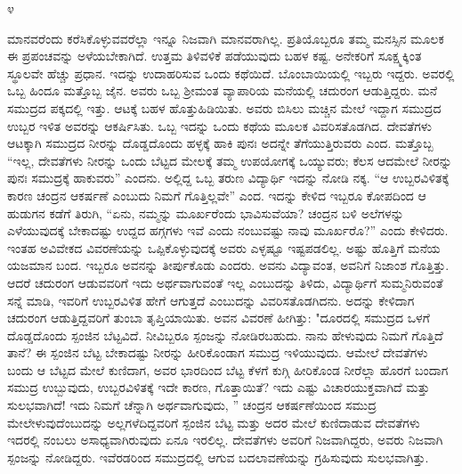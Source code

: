 \begin{center}
೪
\end{center}

ಮಾನವರೆಂದು ಕರೆಸಿಕೊಳ್ಳುವವರೆಲ್ಲಾ ಇನ್ನೂ ನಿಜವಾಗಿ ಮಾನವರಾಗಿಲ್ಲ. ಪ್ರತಿಯೊಬ್ಬರೂ ತಮ್ಮ ಮನಸ್ಸಿನ ಮೂಲಕ ಈ ಪ್ರಪಂಚವನ್ನು ಅಳೆಯಬೇಕಾಗಿದೆ. ಉತ್ತಮ ತಿಳಿವಳಿಕೆ ಪಡೆಯುವುದು ಬಹಳ ಕಷ್ಟ. ಅನೇಕರಿಗೆ ಸೂಕ್ಷ್ಮಕ್ಕಿಂತ ಸ್ಥೂಲವೇ ಹೆಚ್ಚು ಪ್ರಧಾನ. ಇದನ್ನು ಉದಾಹರಿಸುವ ಒಂದು ಕಥೆಯಿದೆ. ಬೊಂಬಾಯಿಯಲ್ಲಿ ಇಬ್ಬರು ಇದ್ದರು. ಅವರಲ್ಲಿ ಒಬ್ಬ ಹಿಂದೂ ಮತ್ತೊಬ್ಬ ಜೈನ. ಅವರು ಒಬ್ಬ ಶ‍್ರೀಮಂತ ವ್ಯಾಪಾರಿಯ ಮನೆಯಲ್ಲಿ ಚದುರಂಗ ಆಡುತ್ತಿದ್ದರು. ಮನೆ ಸಮುದ್ರದ ಪಕ್ಕದಲ್ಲಿ ಇತ್ತು. ಆಟಕ್ಕೆ ಬಹಳ ಹೊತ್ತುಹಿಡಿಯಿತು. ಅವರು ಬಿಸಿಲು ಮಚ್ಚಿನ ಮೇಲೆ ಇದ್ದಾಗ ಸಮುದ್ರದ ಉಬ್ಬರ ಇಳಿತ ಅವರನ್ನು ಆಕರ್ಷಿಸಿತು. ಒಬ್ಬ ಇದನ್ನು ಒಂದು ಕಥೆಯ ಮೂಲಕ ವಿವರಿಸತೊಡಗಿದ. ದೇವತೆಗಳು ಆಟಕ್ಕಾಗಿ ಸಮುದ್ರದ ನೀರನ್ನು ದೊಡ್ಡದೊಂದು ಹಳ್ಳಕ್ಕೆ ಹಾಕಿ ಪುನಃ ಅದನ್ನೇ ತೆಗೆಯುತ್ತಿರುವರು ಎಂದ. ಮತ್ತೊಬ್ಬ “ಇಲ್ಲ, ದೇವತೆಗಳು ನೀರನ್ನು ಒಂದು ಬೆಟ್ಟದ ಮೇಲಕ್ಕೆ ತಮ್ಮ ಉಪಯೋಗಕ್ಕೆ ಒಯ್ಯುವರು; ಕೆಲಸ ಆದಮೇಲೆ ನೀರನ್ನು ಪುನಃ ಸಮುದ್ರಕ್ಕೆ ಹಾಕುವರು” ಎಂದನು. ಅಲ್ಲಿದ್ದ ಒಬ್ಬ ತರುಣ ವಿದ್ಯಾರ್ಥಿ ಇದನ್ನು ನೋಡಿ ನಕ್ಕ. “ಆ ಉಬ್ಬರವಿಳಿತಕ್ಕೆ ಕಾರಣ ಚಂದ್ರನ ಆಕರ್ಷಣೆ ಎಂಬುದು ನಿಮಗೆ ಗೊತ್ತಿಲ್ಲವೇ'' ಎಂದ. ಇದನ್ನು ಕೇಳಿದ ಇಬ್ಬರೂ ಕೋಪದಿಂದ ಆ ಹುಡುಗನ ಕಡೆಗೆ ತಿರುಗಿ, “ಏನು, ನಮ್ಮನ್ನು ಮೂರ್ಖರೆಂದು ಭಾವಿಸುವೆಯಾ? ಚಂದ್ರನ ಬಳಿ ಅಲೆಗಳನ್ನು ಎಳೆಯುವುದಕ್ಕೆ ಬೇಕಾದಷ್ಟು ಉದ್ದದ ಹಗ್ಗಗಳು ಇವೆ ಎಂದು ನಂಬುವಷ್ಟು ನಾವು ಮೂರ್ಖರೊ?” ಎಂದು ಕೇಳಿದರು. ಇಂತಹ ಅವಿವೇಕದ ವಿವರಣೆಯನ್ನು ಒಪ್ಪಿಕೊಳ್ಳುವುದಕ್ಕೆ ಅವರು ಎಳ್ಳಷ್ಟೂ ಇಷ್ಟಪಡಲಿಲ್ಲ. ಅಷ್ಟು ಹೊತ್ತಿಗೆ ಮನೆಯ ಯಜಮಾನ ಬಂದ. ಇಬ್ಬರೂ ಅವನನ್ನು ತೀರ್ಪುಕೊಡು ಎಂದರು. ಅವನು ವಿದ್ಯಾವಂತ, ಅವನಿಗೆ ನಿಜಾಂಶ ಗೊತ್ತಿತ್ತು. ಆದರೆ ಚದುರಂಗ ಆಡುವವರಿಗೆ ಇದು ಅರ್ಥವಾಗುವಂತೆ ಇಲ್ಲ ಎಂಬುದನ್ನು ತಿಳಿದು, ವಿದ್ಯಾರ್ಥಿಗೆ ಸುಮ್ಮನಿರುವಂತೆ ಸನ್ನೆ ಮಾಡಿ, ಇವರಿಗೆ ಉಬ್ಬರವಿಳಿತ ಹೇಗೆ ಆಗುತ್ತದೆ ಎಂಬುದನ್ನು ವಿವರಿಸತೊಡಗಿದನು. ಅದನ್ನು ಕೇಳಿದಾಗ ಚದುರಂಗ ಆಡುತ್ತಿದ್ದವರಿಗೆ ತುಂಬಾ ತೃಪ್ತಿಯಾಯಿತು. ಅವನ ವಿವರಣೆ ಹೀಗಿತ್ತು: "ದೂರದಲ್ಲಿ ಸಮುದ್ರದ ಒಳಗೆ ದೊಡ್ಡದೊಂದು ಸ್ಪಂಜಿನ ಬೆಟ್ಟವಿದೆ. ನೀವಿಬ್ಬರೂ ಸ್ಪಂಜನ್ನು ನೋಡಿರಬಹುದು. ನಾನು ಹೇಳುವುದು ನಿಮಗೆ ಗೊತ್ತಿದೆ ತಾನೆ? ಈ ಸ್ಪಂಜಿನ ಬೆಟ್ಟ ಬೇಕಾದಷ್ಟು ನೀರನ್ನು ಹೀರಿಕೊಂಡಾಗ ಸಮುದ್ರ ಇಳಿಯುವುದು. ಆಮೇಲೆ ದೇವತೆಗಳು ಬಂದು ಆ ಬೆಟ್ಟದ ಮೇಲೆ ಕುಣಿದಾಗ, ಅವರ ಭಾರದಿಂದ ಬೆಟ್ಟ ಕೆಳಗೆ ಕುಗ್ಗಿ ಹೀರಿಕೊಂಡ ನೀರೆಲ್ಲಾ ಹೊರಗೆ ಬಂದಾಗ ಸಮುದ್ರ ಉಬ್ಬುವುದು, ಉಬ್ಬರವಿಳಿತಕ್ಕೆ ಇದೇ ಕಾರಣ, ಗೊತ್ತಾಯಿತೆ? ಇದು ಎಷ್ಟು ವಿಚಾರಯುಕ್ತವಾಗಿದೆ ಮತ್ತು ಸುಲಭವಾಗಿದೆ! ಇದು ನಿಮಗೆ ಚೆನ್ನಾಗಿ ಅರ್ಥವಾಗುವುದು, '' ಚಂದ್ರನ ಆಕರ್ಷಣೆಯಿಂದ ಸಮುದ್ರ ಮೇಲೇಳುವುದೆಂಬುದನ್ನು ಅಲ್ಲಗಳೆದಿದ್ದವರಿಗೆ ಸ್ಪಂಜಿನ ಬೆಟ್ಟ ಮತ್ತು ಅದರ ಮೇಲೆ ಕುಣಿದಾಡುವ ದೇವತೆಗಳು ಇದರಲ್ಲಿ ನಂಬಲು ಅಸಾಧ್ಯವಾಗಿರುವುದು ಏನೂ ಇರಲಿಲ್ಲ. ದೇವತೆಗಳು ಅವರಿಗೆ ನಿಜವಾಗಿದ್ದರು, ಅವರು ನಿಜವಾಗಿ ಸ್ಪಂಜನ್ನು ನೋಡಿದ್ದರು. ಇವೆರಡರಿಂದ ಸಮುದ್ರದಲ್ಲಿ ಆಗುವ ಬದಲಾವಣೆಯನ್ನು ಗ್ರಹಿಸುವುದು ಸುಲಭವಾಗಿತ್ತು.

